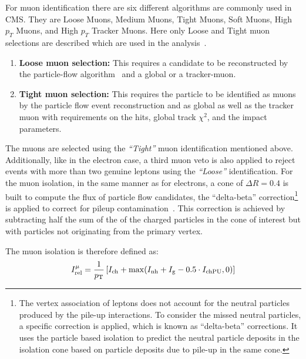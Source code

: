 For muon identification there are six different algorithms are commonly used in CMS. They are Loose Muons, Medium Muons, Tight Muons, Soft Muons, High $p_T$ Muons, and High $p_T$ Tracker Muons. Here only Loose and Tight muon selections are described which are used in the analysis~\cite{Kraetschmer2016}.
\begin{enumerate}
  \item \textbf{Loose muon selection:} This requires a candidate to be reconstructed by the particle-flow algorithm~\cite{Particle_flow_2010} and a global or a tracker-muon.
  \item \textbf{Tight muon selection:} This requires the particle to be identified as muons by the particle flow event reconstruction and as global as well as the tracker muon with requirements on the hits, global track $\chi^2$, and the impact parameters.
\end{enumerate}

The muons are selected using the {\em``Tight''} muon identification mentioned above.
Additionally, like in the electron case, a third muon veto is also applied to reject events with more than two genuine leptons using the {\em``Loose''} identification. 
For the muon isolation, in the same manner as for electrons, a cone of $\Delta R = 0.4$ is built to compute the flux of particle flow candidates, the ``delta-beta'' correction\footnote{The vertex association of leptons does not account for the neutral particles produced by the pile-up interactions. To consider the missed neutral particles, a specific correction is applied, which is known as ``delta-beta'' corrections. It uses the particle based isolation to predict the neutral particle deposits in the isolation cone based on particle deposits due to pile-up in the same cone.} is applied to correct for pileup contamination~\cite{Bachtis2013}.
This correction is achieved by subtracting half the sum of the \pt of the charged particles in the cone of interest but with particles not originating from the primary vertex.

The muon isolation is therefore defined as:
\begin{equation}
I^{\mu}_{\rm rel}=\frac{1}{p_{\rm T}}  \left[ I_{\rm ch}+\max(I_{\rm nh}+I_{\rm g}-0.5\cdot I_{\rm chPU} ,0) \right]
\label{eq:muisol}
\end{equation}
 
